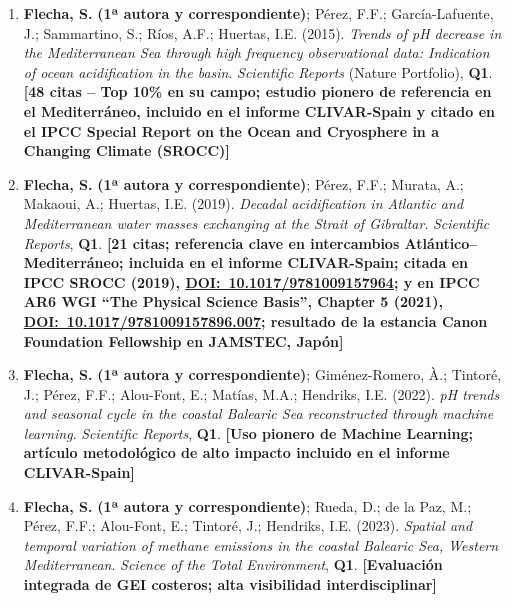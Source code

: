\documentclass[11pt,a4paper]{article}
\newcommand{\publication}[1]{\item #1}
\begin{document}
\begin{enumerate}[leftmargin=*]

    \publication{\textbf{Flecha, S.} \textbf{(1ª autora y correspondiente)}; Pérez, F.F.; García-Lafuente, J.; Sammartino, S.; Ríos, A.F.; Huertas, I.E. (2015). 
    \textit{Trends of pH decrease in the Mediterranean Sea through high frequency observational data: Indication of ocean acidification in the basin}. 
    \textit{Scientific Reports} (Nature Portfolio), \textbf{Q1}. 
    \textbf{[48 citas – Top 10\% en su campo; estudio pionero de referencia en el Mediterráneo, incluido en el informe CLIVAR-Spain y citado en el IPCC Special Report on the Ocean and Cryosphere in a Changing Climate (SROCC)]}}

    \publication{\textbf{Flecha, S.} \textbf{(1ª autora y correspondiente)}; Pérez, F.F.; Murata, A.; Makaoui, A.; Huertas, I.E. (2019). 
    \textit{Decadal acidification in Atlantic and Mediterranean water masses exchanging at the Strait of Gibraltar}. 
    \textit{Scientific Reports}, \textbf{Q1}. 
    \textbf{[21 citas; referencia clave en intercambios Atlántico–Mediterráneo; incluida en el informe CLIVAR-Spain; \textbf{citada en IPCC SROCC (2019), \href{https://www.ipcc.ch/site/assets/uploads/sites/3/2022/03/SROCC_Ch05-SM_FINAL.pdf}{DOI:~10.1017/9781009157964}; y en IPCC AR6 WGI ``The Physical Science Basis'', Chapter 5 (2021), \href{https://www.ipcc.ch/report/ar6/wg1/downloads/report/IPCC_AR6_WGI_Chapter05_SM.pdf}{DOI:~10.1017/9781009157896.007}}; resultado de la estancia Canon Foundation Fellowship en JAMSTEC, Japón]}}

    \publication{\textbf{Flecha, S.} \textbf{(1ª autora y correspondiente)}; Giménez-Romero, À.; Tintoré, J.; Pérez, F.F.; Alou-Font, E.; Matías, M.A.; Hendriks, I.E. (2022). 
    \textit{pH trends and seasonal cycle in the coastal Balearic Sea reconstructed through machine learning}. 
    \textit{Scientific Reports}, \textbf{Q1}. 
    \textbf{[Uso pionero de Machine Learning; artículo metodológico de alto impacto incluido en el informe CLIVAR-Spain]}}

    \publication{\textbf{Flecha, S.} \textbf{(1ª autora y correspondiente)}; Rueda, D.; de la Paz, M.; Pérez, F.F.; Alou-Font, E.; Tintoré, J.; Hendriks, I.E. (2023). 
    \textit{Spatial and temporal variation of methane emissions in the coastal Balearic Sea, Western Mediterranean}. 
    \textit{Science of the Total Environment}, \textbf{Q1}. 
    \textbf{[Evaluación integrada de GEI costeros; alta visibilidad interdisciplinar]}}


\end{enumerate}
\end{document}
